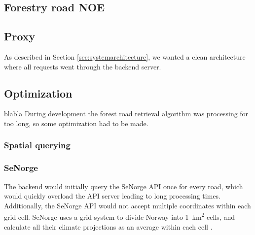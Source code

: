 \subsection{Forestry road NOE} %

\subsection{Proxy}\label{subsec:proxy}

As described in Section \ref{sec:systemarchitecture}, we wanted a clean architecture where all requests went through the backend server. 


\subsection{Optimization}
blabla During development the forest road retrieval algorithm was processing for too long, so some optimization had to be made.

\subsubsection{Spatial querying}


\subsubsection{SeNorge}

The backend would initially query the SeNorge API once for every road, which would quickly overload the API server leading to long processing times. Additionally, the SeNorge API would not accept multiple coordinates within each grid-cell. SeNorge uses a grid system to divide Norway into \qty{1}{\kilo\meter\squared} cells, and calculate all their climate projections as an average within each cell \cite{senorge_omvannkart}. 

